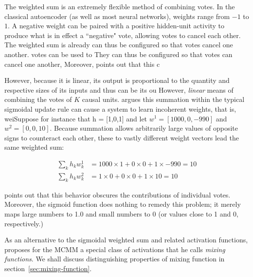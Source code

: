 The weighted sum is an extremely flexible method of combining votes. In the classical autoencoder (as well as most neural networks), weights range from $-1$ to $1$. A negative weight can be paired with a positive hidden-unit activity to produce what is in effect a ``negative" vote, allowing votes to cancel each other. The weighted sum is already can thus be configured so that votes cancel one another. votes can be used to They can thus be configured so that votes can cancel one another,   Moreover, \citet{saund:94} points out that this c

However, because it is linear, its output is proportional to the quantity and respective sizes of its inputs and thus can be its ou However,  \emph{linear} means of combining the votes of $K$ causal units. \citet{saund:94} argues this summation within the typical sigmoidal update rule can cause a system to learn incoherent weights, that is, weiSuppose for instance that h = [1,0,1] and let $w^1 = [1000,0,-990]$ and $w^2  = [0,0,10]$. Because summation allows arbitrarily large values of opposite signs to counteract each other,
these to vastly different weight vectors lead the same weighted sum:

\begin{align}
\sum_{k} h_{k} w^{1}_{k} &= 1000 \times 1  + 0 \times 0 + 1 \times -990 = 10 \\ 
\sum_{k} h_{k} w^{2}_{k} &= 1 \times 0 + 0 \times 0 +  1 \times 10 = 10
\end{align}

\cite{saund:94} points out that this behavior obscures the contributions of individual votes. Moreover, the sigmoid function does nothing to remedy this problem; it merely maps large numbers to 1.0 and small numbers to 0 (or values close to 1 and 0, respectively.)


As an alternative to the sigmoidal weighted sum and related activation functions, \cite{saund:94} proposes for the MCMM a special class of activations that he calls \emph{mixing functions}. We shall discuss distinguishing properties of mixing function in section~\ref{sec:mixing-function}.

